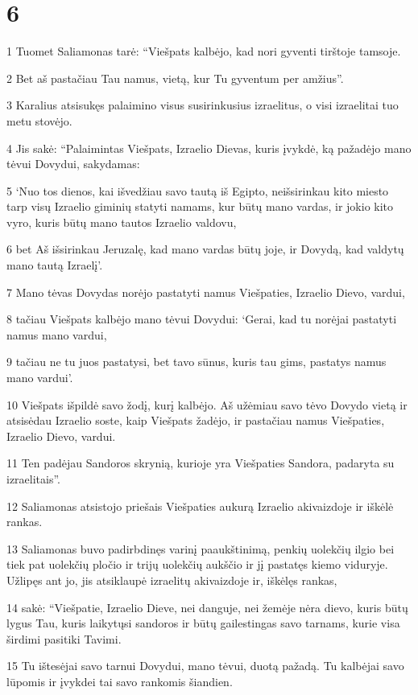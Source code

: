 \chapter{6}

\par 1 Tuomet Saliamonas tarė: “Viešpats kalbėjo, kad nori gyventi tirštoje tamsoje. 
\par 2 Bet aš pastačiau Tau namus, vietą, kur Tu gyventum per amžius”. 
\par 3 Karalius atsisukęs palaimino visus susirinkusius izraelitus, o visi izraelitai tuo metu stovėjo. 
\par 4 Jis sakė: “Palaimintas Viešpats, Izraelio Dievas, kuris įvykdė, ką pažadėjo mano tėvui Dovydui, sakydamas: 
\par 5 ‘Nuo tos dienos, kai išvedžiau savo tautą iš Egipto, neišsirinkau kito miesto tarp visų Izraelio giminių statyti namams, kur būtų mano vardas, ir jokio kito vyro, kuris būtų mano tautos Izraelio valdovu, 
\par 6 bet Aš išsirinkau Jeruzalę, kad mano vardas būtų joje, ir Dovydą, kad valdytų mano tautą Izraelį’. 
\par 7 Mano tėvas Dovydas norėjo pastatyti namus Viešpaties, Izraelio Dievo, vardui, 
\par 8 tačiau Viešpats kalbėjo mano tėvui Dovydui: ‘Gerai, kad tu norėjai pastatyti namus mano vardui, 
\par 9 tačiau ne tu juos pastatysi, bet tavo sūnus, kuris tau gims, pastatys namus mano vardui’. 
\par 10 Viešpats išpildė savo žodį, kurį kalbėjo. Aš užėmiau savo tėvo Dovydo vietą ir atsisėdau Izraelio soste, kaip Viešpats žadėjo, ir pastačiau namus Viešpaties, Izraelio Dievo, vardui. 
\par 11 Ten padėjau Sandoros skrynią, kurioje yra Viešpaties Sandora, padaryta su izraelitais”. 
\par 12 Saliamonas atsistojo priešais Viešpaties aukurą Izraelio akivaizdoje ir iškėlė rankas. 
\par 13 Saliamonas buvo padirbdinęs varinį paaukštinimą, penkių uolekčių ilgio bei tiek pat uolekčių pločio ir trijų uolekčių aukščio ir jį pastatęs kiemo viduryje. Užlipęs ant jo, jis atsiklaupė izraelitų akivaizdoje ir, iškėlęs rankas, 
\par 14 sakė: “Viešpatie, Izraelio Dieve, nei danguje, nei žemėje nėra dievo, kuris būtų lygus Tau, kuris laikytųsi sandoros ir būtų gailestingas savo tarnams, kurie visa širdimi pasitiki Tavimi. 
\par 15 Tu ištesėjai savo tarnui Dovydui, mano tėvui, duotą pažadą. Tu kalbėjai savo lūpomis ir įvykdei tai savo rankomis šiandien. 
